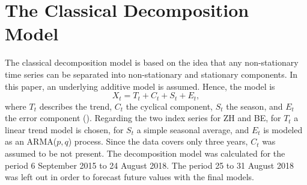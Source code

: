 \documentclass[11pt]{article}
\begin{document}
\section{The Classical Decomposition Model}
The classical decomposition model is based on the idea that any non-stationary time series can be separated into non-stationary and stationary components. In this paper, an underlying additive model is assumed. Hence, the model is
\begin{equation}
 X_{t}=T_{t}+C_{t}+S_{t}+E_{t},
 \end{equation}
 where \(T_t\) describes the trend, \(C_t\) the cyclical component, \(S_t\) the season, and \(E_t\) the error component (\cite{brockdavTHEORY}). Regarding the two index series for ZH and BE, for \(T_t\) a linear trend model is chosen, for \(S_t\) a simple seasonal average, and \(E_t\) is modeled as an ARMA(\(p,q\)) process. Since the data covers only three years, \(C_t\) was assumed to be not present. The decomposition model was calculated for the period 6 September 2015 to 24 August 2018. The period 25 to 31 August 2018 was left out in order to forecast future values with the final models.
\end{document}
